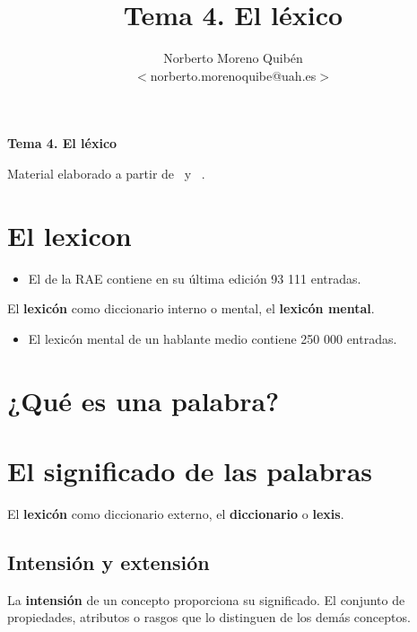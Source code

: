 \documentclass[12pt]{article}
\title{Tema 4. El léxico}
\author{Norberto Moreno Quibén\\
        \small $<$norberto.morenoquibe@uah.es$>$}
\date{}
\begin{document}
\textbf{\Large Tema 4. El léxico}

\tableofcontents

Material elaborado a partir de~\textcite{bosque1982sobre-la-teoria,bosque2004combinatoria-y-signi,murphy2010lexicalmeaning,jezek2015the-lexicon-an,pustejovsky2019the-lexicon} y ~\textcite[caps. «Lexicología» y «Diccionarios»][]{2016enciclopedia-de-linguistica}.

%
%
\printbibliography

\section{El lexicon}
\begin{itemize}
  \item El \href{https://dle.rae.es/?w=diccionario}{} de la RAE contiene en su última edición 93 111 entradas.
\end{itemize}


El \textbf{lexicón} como diccionario interno o mental, el \textbf{lexicón mental}.
\begin{itemize}
  \item El lexicón mental de un hablante medio contiene 250 000 entradas.
\end{itemize}



\section{¿Qué es una palabra?}
\section{El significado de las palabras}

El \textbf{lexicón} como diccionario externo, el \textbf{diccionario} o \textbf{lexis}.

\subsection{Intensión y extensión}

La \textbf{intensión} de un concepto proporciona su significado. El conjunto de propiedades, atributos o rasgos que lo distinguen de los demás conceptos.
\end{document}
